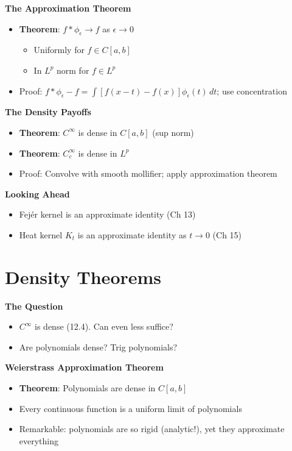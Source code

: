 \documentclass[
  10pt,
  letterpaper,
]{scrbook}
\providecommand{\tightlist}{%
  \setlength{\itemsep}{0pt}\setlength{\parskip}{0pt}}
\begin{document}
\textbf{The Approximation Theorem}

\begin{itemize}
\tightlist
\item
  \textbf{Theorem}: \(f * \phi_\epsilon \to f\) as \(\epsilon \to 0\)

  \begin{itemize}
  \tightlist
  \item
    Uniformly for \(f \in C[a,b]\)
  \item
    In \(L^p\) norm for \(f \in L^p\)
  \end{itemize}
\item
  Proof:
  \(f * \phi_\epsilon - f = \int [f(x-t) - f(x)]\phi_\epsilon(t)\, dt\);
  use concentration
\end{itemize}

\textbf{The Density Payoffs}

\begin{itemize}
\tightlist
\item
  \textbf{Theorem}: \(C^\infty\) is dense in \(C[a,b]\) (sup norm)
\item
  \textbf{Theorem}: \(C_c^\infty\) is dense in \(L^p\)
\item
  Proof: Convolve with smooth mollifier; apply approximation theorem
\end{itemize}

\textbf{Looking Ahead}

\begin{itemize}
\tightlist
\item
  Fejér kernel is an approximate identity (Ch 13)
\item
  Heat kernel \(K_t\) is an approximate identity as \(t \to 0\) (Ch 15)
\end{itemize}

\section{Density Theorems}\label{density-theorems}

\textbf{The Question}

\begin{itemize}
\tightlist
\item
  \(C^\infty\) is dense (12.4). Can even less suffice?
\item
  Are polynomials dense? Trig polynomials?
\end{itemize}

\textbf{Weierstrass Approximation Theorem}

\begin{itemize}
\tightlist
\item
  \textbf{Theorem}: Polynomials are dense in \(C[a,b]\)
\item
  Every continuous function is a uniform limit of polynomials
\item
  Remarkable: polynomials are so rigid (analytic!), yet they approximate
  everything
\end{itemize}
\end{document}
